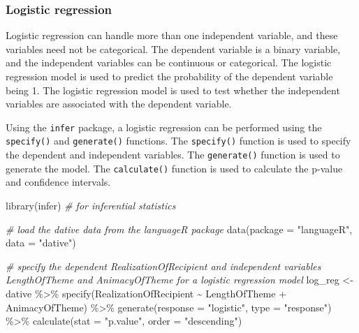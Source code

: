 \documentclass[
  letterpaper,
]{latex/krantz}
\newenvironment{Shaded}{\begin{snugshade}}{\end{snugshade}}
\newcommand{\AttributeTok}[1]{\textcolor[rgb]{0.00,0.00,0.00}{#1}}
\newcommand{\CommentTok}[1]{\textcolor[rgb]{0.00,0.00,0.00}{\textit{#1}}}
\newcommand{\FunctionTok}[1]{\textcolor[rgb]{0.00,0.00,0.00}{#1}}
\newcommand{\NormalTok}[1]{\textcolor[rgb]{0.00,0.00,0.00}{#1}}
\newcommand{\OtherTok}[1]{\textcolor[rgb]{0.00,0.00,0.00}{#1}}
\newcommand{\SpecialCharTok}[1]{\textcolor[rgb]{0.00,0.00,0.00}{#1}}
\newcommand{\StringTok}[1]{\textcolor[rgb]{0.00,0.00,0.00}{#1}}
\begin{document}
\hypertarget{ida-logistic-regression}{%
\subsubsection{Logistic regression}\label{ida-logistic-regression}}

Logistic regression can handle more than one independent variable, and
these variables need not be categorical. The dependent variable is a
binary variable, and the independent variables can be continuous or
categorical. The logistic regression model is used to predict the
probability of the dependent variable being 1. The logistic regression
model is used to test whether the independent variables are associated
with the dependent variable.

Using the \texttt{infer} package, a logistic regression can be performed
using the \texttt{specify()} and \texttt{generate()} functions. The
\texttt{specify()} function is used to specify the dependent and
independent variables. The \texttt{generate()} function is used to
generate the model. The \texttt{calculate()} function is used to
calculate the p-value and confidence intervals.

\begin{Shaded}
\begin{Highlighting}[]
\FunctionTok{library}\NormalTok{(infer) }\CommentTok{\# for inferential statistics}

\CommentTok{\# load the \textasciigrave{}dative\textasciigrave{} data from the \textasciigrave{}languageR\textasciigrave{} package}
\FunctionTok{data}\NormalTok{(}\AttributeTok{package =} \StringTok{"languageR"}\NormalTok{, }\AttributeTok{data =} \StringTok{"dative"}\NormalTok{)}

\CommentTok{\# specify the dependent \textasciigrave{}RealizationOfRecipient\textasciigrave{} and independent variables \textasciigrave{}LengthOfTheme\textasciigrave{} and \textasciigrave{}AnimacyOfTheme\textasciigrave{} for a logistic regression model}
\NormalTok{log\_reg }\OtherTok{\textless{}{-}} 
\NormalTok{  dative }\SpecialCharTok{\%\textgreater{}\%}
  \FunctionTok{specify}\NormalTok{(RealizationOfRecipient }\SpecialCharTok{\textasciitilde{}}\NormalTok{ LengthOfTheme }\SpecialCharTok{+}\NormalTok{ AnimacyOfTheme) }\SpecialCharTok{\%\textgreater{}\%}
  \FunctionTok{generate}\NormalTok{(}\AttributeTok{response =} \StringTok{"logistic"}\NormalTok{, }\AttributeTok{type =} \StringTok{"response"}\NormalTok{) }\SpecialCharTok{\%\textgreater{}\%}
  \FunctionTok{calculate}\NormalTok{(}\AttributeTok{stat =} \StringTok{"p.value"}\NormalTok{, }\AttributeTok{order =} \StringTok{"descending"}\NormalTok{)}
\end{Highlighting}
\end{Shaded}
\end{document}
